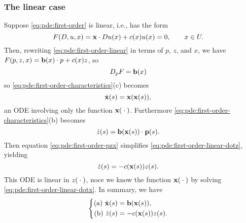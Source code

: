 \subsubsection{The linear case}
Suppose \eqref{eq:pde:first-order} is linear, i.e., has the form
\begin{equation}
  \label{eq:pde:first-order-linear}
  F(D,u,x)=\mathbf{x}\cdot Du(x)+c(x)u(x)=0,\qquad x\in U.
\end{equation}
Then, rewriting \eqref{eq:pde:first-order-linear} in terms of \(p\), \(z\),
and \(x\), we have\(F(p,z,x)=\mathbf{b}(x)\cdot p+c(x)z\), so
\[
  D_pF=\mathbf{b}(x)
\]
so \eqref{eq:pde:first-order-characteristics}(c) becomes
\begin{equation}
  \label{eq:pde:first-order-linear-dotx}
  \dot{\mathbf{x}}(s)=\mathbf{x}(\mathbf{x}(s)),
\end{equation}
an ODE involving only the function \(\mathbf{x}({}\cdot{})\). Furthermore
\eqref{eq:pde:first-order-characteristics}(b) becomes
\begin{equation}
  \label{eq:pde:first-order-linear-dotz}
  \dot z(s)=\mathbf{b}(\mathbf{x}(s))\cdot\mathbf{p}(s).
\end{equation}
Then equation \eqref{eq:pde:first-order-pzx} simplifies
\eqref{eq:pde:first-order-linear-dotz}, yielding
\[
  \dot z(s)=-c(\mathbf{x}(s))z(s).
\]
This ODE is linear in \(z({}\cdot{})\), noce we know the function
\(\mathbf{x}({}\cdot{})\) by solving \eqref{eq:pde:first-order-linear-dotx}. In
summary, we have
\begin{equation}
  \label{eq:pde:first-order-linear-characteristics}
  \left\{
    \begin{aligned}
      \text{(a) }\dot{\mathbf{x}}(s)&=\mathbf{b}(\mathbf{x}(s)),\\
      \text{(b) }\dot z(s)&=-c(\mathbf{x}(s))z(s).
    \end{aligned}
  \right.
\end{equation}


